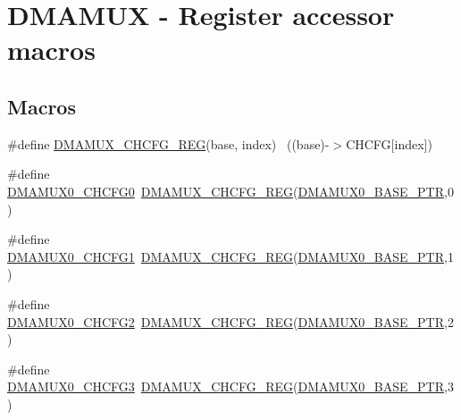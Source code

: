 \hypertarget{group___d_m_a_m_u_x___register___accessor___macros}{}\section{D\+M\+A\+M\+UX -\/ Register accessor macros}
\label{group___d_m_a_m_u_x___register___accessor___macros}
\subsection*{Macros}
\begin{DoxyCompactItemize}
\item 
\#define \hyperlink{group___d_m_a_m_u_x___register___accessor___macros_ga10cf09fe06ed04dc004b7b41da7cbf0d}{D\+M\+A\+M\+U\+X\+\_\+\+C\+H\+C\+F\+G\+\_\+\+R\+EG}(base,  index)                      ~((base)-\/$>$C\+H\+C\+FG\mbox{[}index\mbox{]})
\item 
\#define \hyperlink{group___d_m_a_m_u_x___register___accessor___macros_gafbdd08eec205390f76af0e1e2aa323cf}{D\+M\+A\+M\+U\+X0\+\_\+\+C\+H\+C\+F\+G0}~\hyperlink{group___d_m_a_m_u_x___register___accessor___macros_ga10cf09fe06ed04dc004b7b41da7cbf0d}{D\+M\+A\+M\+U\+X\+\_\+\+C\+H\+C\+F\+G\+\_\+\+R\+EG}(\hyperlink{group___d_m_a_m_u_x___peripheral_ga403b61d306820e4e1113c636300004a3}{D\+M\+A\+M\+U\+X0\+\_\+\+B\+A\+S\+E\+\_\+\+P\+TR},0)
\item 
\#define \hyperlink{group___d_m_a_m_u_x___register___accessor___macros_ga8c0edd8cf3e5d5f046ceb4df69c8724b}{D\+M\+A\+M\+U\+X0\+\_\+\+C\+H\+C\+F\+G1}~\hyperlink{group___d_m_a_m_u_x___register___accessor___macros_ga10cf09fe06ed04dc004b7b41da7cbf0d}{D\+M\+A\+M\+U\+X\+\_\+\+C\+H\+C\+F\+G\+\_\+\+R\+EG}(\hyperlink{group___d_m_a_m_u_x___peripheral_ga403b61d306820e4e1113c636300004a3}{D\+M\+A\+M\+U\+X0\+\_\+\+B\+A\+S\+E\+\_\+\+P\+TR},1)
\item 
\#define \hyperlink{group___d_m_a_m_u_x___register___accessor___macros_gaa1b0bee7c4b71acced055cef09768a29}{D\+M\+A\+M\+U\+X0\+\_\+\+C\+H\+C\+F\+G2}~\hyperlink{group___d_m_a_m_u_x___register___accessor___macros_ga10cf09fe06ed04dc004b7b41da7cbf0d}{D\+M\+A\+M\+U\+X\+\_\+\+C\+H\+C\+F\+G\+\_\+\+R\+EG}(\hyperlink{group___d_m_a_m_u_x___peripheral_ga403b61d306820e4e1113c636300004a3}{D\+M\+A\+M\+U\+X0\+\_\+\+B\+A\+S\+E\+\_\+\+P\+TR},2)
\item 
\#define \hyperlink{group___d_m_a_m_u_x___register___accessor___macros_ga91901af15d28d4df4369689afa83ed91}{D\+M\+A\+M\+U\+X0\+\_\+\+C\+H\+C\+F\+G3}~\hyperlink{group___d_m_a_m_u_x___register___accessor___macros_ga10cf09fe06ed04dc004b7b41da7cbf0d}{D\+M\+A\+M\+U\+X\+\_\+\+C\+H\+C\+F\+G\+\_\+\+R\+EG}(\hyperlink{group___d_m_a_m_u_x___peripheral_ga403b61d306820e4e1113c636300004a3}{D\+M\+A\+M\+U\+X0\+\_\+\+B\+A\+S\+E\+\_\+\+P\+TR},3)

\end{DoxyCompactItemize}
